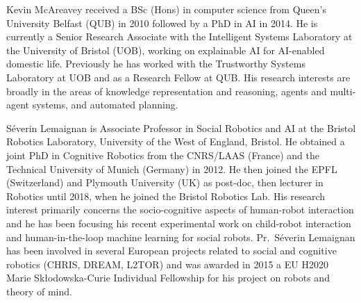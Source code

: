 \documentclass[letterpaper, 10 pt, journal, twoside]{IEEEtran}
\begin{document}
\begin{IEEEbiography}{Kevin McAreavey}
received a BSc (Hons) in computer science from Queen's University Belfast (QUB) in 2010 followed by a PhD in AI in 2014. He is currently a Senior Research Associate with the Intelligent Systems Laboratory at the University of Bristol (UOB), working on explainable AI for AI-enabled domestic life. Previously he has worked with the Trustworthy Systems Laboratory at UOB and as a Research Fellow at QUB. His research interests are broadly in the areas of knowledge representation and reasoning, agents and multi-agent systems, and automated planning.
\end{IEEEbiography}

\begin{IEEEbiography}{S\'everin Lemaignan}
is Associate Professor in Social Robotics and AI at the Bristol Robotics Laboratory, University of the West of England, Bristol. He obtained a joint PhD in Cognitive Robotics from the CNRS/LAAS (France) and the Technical University of Munich (Germany) in 2012. He then joined the EPFL (Switzerland) and Plymouth University (UK) as post-doc, then lecturer in Robotics until 2018, when he joined the Bristol Robotics Lab. His research interest primarily concerns the socio-cognitive aspects of human-robot interaction and he has been focusing his recent experimental work on child-robot interaction and human-in-the-loop machine learning for social robots. Pr.\ S\'everin Lemaignan has been involved in several European projects related to social and cognitive robotics (CHRIS, DREAM, L2TOR) and was  awarded in 2015 a EU H2020 Marie Sk\l{}odowska-Curie Individual Fellowship for his project on robots and theory of mind.
\end{IEEEbiography}
\end{document}
